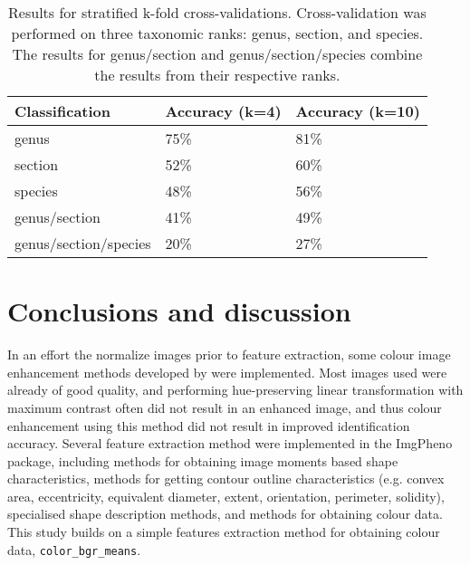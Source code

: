 \documentclass[3p,twocolumn,10pt]{elsarticle}
\begin{document}
\begin{table}[h]\footnotesize
    \caption{Results for stratified k-fold cross-validations. Cross-validation was performed on three taxonomic ranks: genus, section, and species. The results for genus/section and genus/section/species combine the results from their respective ranks.}
    \begin{center}
    \begin{tabular}{lp{1.5cm}p{1.5cm}}
    \toprule
    \textbf{Classification} & \textbf{Accuracy (k=4)} & \textbf{Accuracy (k=10)} \\
    \midrule
    genus                   & 75\%    & 81\% \\
    section                 & 52\%    & 60\% \\
    species                 & 48\%    & 56\% \\
    genus/section           & 41\%    & 49\% \\
    genus/section/species   & 20\%    & 27\% \\
    \bottomrule
    \end{tabular}
    \end{center}
    \label{tbl:x-validation-results}
\end{table}

\section{Conclusions and discussion}
\label{sect:conclusion}

In an effort the normalize images prior to feature extraction, some colour image enhancement methods developed by \citet{Naik2003} were implemented. Most images used were already of good quality, and performing hue-preserving linear transformation with maximum contrast often did not result in an enhanced image, and thus colour enhancement using this method did not result in improved identification accuracy. Several feature extraction method were implemented in the ImgPheno package, including methods for obtaining image moments based shape characteristics, methods for getting contour outline characteristics (e.g. convex area, eccentricity, equivalent diameter, extent, orientation, perimeter, solidity), specialised shape description methods, and methods for obtaining colour data. This study builds on a simple features extraction method for obtaining colour data, \verb/color_bgr_means/.

\end{document}
